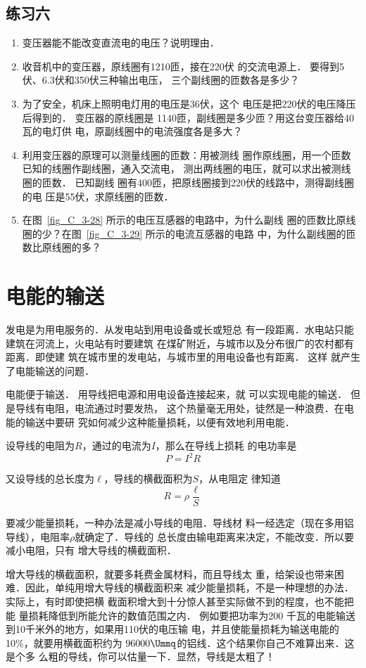 \subsection*{练习六}
\begin{enumerate}
    \item 变压器能不能改变直流电的电压？说明理由．
    \item 收音机中的变压器，原线圈有1210匝，接在220伏
的交流电源上．
要得到5伏、6.3伏和350伏三种输出电压，
三个副线圈的匝数各是多少？
\item 为了安全，机床上照明电灯用的电压是36伏，这个
电压是把220伏的电压降压后得到的．
变压器的原线圈是
1140匝，副线圈是多少匝？用这台变压器给40瓦的电灯供
电，原副线圈中的电流强度各是多大？
\item 利用变压器的原理可以测量线圈的匝数：用被测线
圈作原线圈，用一个匝数已知的线圈作副线圈，通入交流电，
测出两线圈的电压，就可以求出被测线圈的匝数．
已知副线
圈有400匝，把原线圈接到220伏的线路中，测得副线圈的电
压是55伏，求原线圈的匝数．
\item 在图~\ref{fig_C_3-28} 所示的电压互感器的电路中，为什么副线
圈的匝数比原线圈的少？在图~\ref{fig_C_3-29} 所示的电流互感器的电路
中，为什么副线圈的匝数比原线圈的多？
\end{enumerate}

\section{电能的输送}
发电是为用电服务的．从发电站到用电设备或长或短总
有一段距离．水电站只能建筑在河流上，火电站有时要建筑
在煤矿附近，与城市以及分布很广的农村都有距离．即使建
筑在城市里的发电站，与城市里的用电设备也有距离．
这样
就产生了电能输送的问题．

电能便于输送．
用导线把电源和用电设备连接起来，就
可以实现电能的输送．
但是导线有电阻，电流通过时要发热，
这个热量毫无用处，徒然是一种浪费．在电能的输送中要研
究如何减少这种能量损耗，以便有效地利用电能．

设导线的电阻为$R$，通过的电流为$I$，那么在导线上损耗
的电功率是
\[P=I^2R \]

又设导线的总长度为$\ell$，导线的横截面积为$S$，从电阻定
律知道
\[ R=\rho\frac{\ell}{S}\]

要减少能量损耗，一种办法是减小导线的电阻．导线材
料一经选定（现在多用铝导线），电阻率$\rho$就确定了．导线的
总长度由输电距离来决定，不能改变．所以要减小电阻，只有
增大导线的横截面积．

增大导线的横截面积，就要多耗费金属材料，而且导线太
重，给架设也带来困难．因此，单纯用增大导线的横截面积来
减少能量损耗，不是一种理想的办法．实际上，有时即使把横
截面积增大到十分惊人甚至实际做不到的程度，也不能把能
量损耗降低到所能允许的数值范围之内．
例如要把功率为200
千瓦的电能输送到10千米外的地方，如果用110伏的电压输
电，并且使能量损耗为输送电能的10\%，就要用横截面积约为
$96000 \Ummq $的铝线．这个结果你自己不难算出来．这是个多
么粗的导线，你可以估量一下．显然，导线是太粗了！

